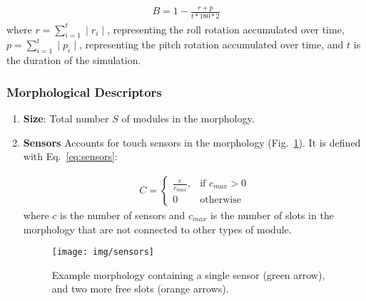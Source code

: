 \documentclass[utf8]{frontiersSCNS} %
\begin{document}
    \begin{eqnarray}
    \label{eq:bal}
    \begin{aligned}
      B = 1 - \frac{r + p}{t * 180 * 2}
    \end{aligned} 
    \end{eqnarray}
    \noindent where $r = \sum_{i=1}^{t}\mid r_i\mid$, representing the roll rotation accumulated over time, $p = \sum_{i=1}^{t}\mid p_i\mid$, representing the pitch rotation accumulated over time,  and $t$ is the duration of the simulation.\\
    

\subsubsection{Morphological Descriptors}

\begin{enumerate}
 
   \item \textbf{Size}: Total number $S$ of modules in the morphology.
 
 
   \item \textbf{Sensors} Accounts for touch sensors in the morphology (Fig.~\ref{fig:sensors}). It is defined with Eq.~\eqref{eq:sensors}: 


\begin{equation}
\begin{gathered}
        C = \begin{cases}
      \frac{c}{c_{max}}, &\text{if } c_{max}>0  \\
                        0 &\text{otherwise}
                    \end{cases}                              \end{gathered}
\label{eq:sensors}
\end{equation}
where $c$ is the number of sensors and $c_{max}$ is the number of slots in the morphology that are not connected to other types of module.


\begin{figure}
\begin{center}
\texttt{[image: img/sensors]}
\vspace{-0.5cm}
\caption{Example morphology containing a single sensor (green arrow), and two more free slots (orange arrows).}
\label{fig:sensors}
\end{center}
\vspace{-0.3cm}
\end{figure}
 
\end{enumerate}
\end{document}
